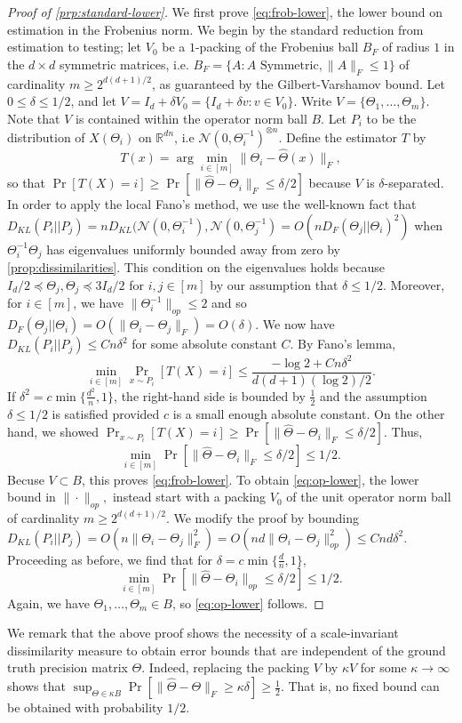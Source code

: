 \documentclass[aos]{imsart}
\theoremstyle{definition}
\numberwithin{equation}{section}
\newcommand{\R}{{\mathbb{R}}}
\newcommand{\htheta}{\widehat{\Theta}}
\newcommand{\ot}{\otimes}
\begin{document}
\begin{proof}[Proof of \cref{prp:standard-lower}]
We first prove \cref{eq:frob-lower}, the lower bound on estimation in the Frobenius norm. We begin by the standard reduction from estimation to testing; let $V_0$ be a $1$-packing of the Frobenius ball $B_F$ of radius $1$ in the $d\times d$ symmetric matrices, i.e. $B_F = \{A: A \text{ Symmetric}, \|A\|_F \leq 1\}$ of cardinality $m \geq 2^{d(d+1)/2}$, as guaranteed by the Gilbert-Varshamov bound. Let $0 \leq \delta \leq 1/2$, and let $V = I_d + \delta V_0 = \{I_d + \delta v: v \in V_0\}$. Write $V = \{\Theta_1, \dots, \Theta_m\}$. Note that $V$ is contained within the operator norm ball $B$.
Let $P_i$ to be the distribution of $X(\Theta_i)$ on $\R^{dn}$, i.e $\mathcal{N}(0, \Theta^{-1}_i)^{\ot n}$. Define the estimator $T$ by 
$$T(x) = \arg\min_{i \in [m]} \|\Theta_i - \htheta(x)\|_F,$$
so that $\Pr[T(X) = i] \geq \Pr[\|\htheta -  \Theta_i\|_F \leq \delta/2]$ because $V$ is $\delta$-separated. In order to apply the local Fano's method, we use the well-known fact that $D_{KL}(P_i|| P_j) = n D_{KL}(\mathcal{N}(0, \Theta_i^{-1}), \mathcal{N}(0, \Theta_j^{-1}) = O(nD_{F}(\Theta_j || \Theta_i)^2)$ when $\Theta_i^{-1}\Theta_j$ has eigenvalues uniformly bounded away from zero by \cref{prop:dissimilarities}. This condition on the eigenvalues holds because $I_d/2 \preceq \Theta_j, \Theta_j \preceq 3I_d/2$ for $i,j \in [m]$ by our assumption that $\delta \leq 1/2$. Moreover, for $i \in [m]$, we have $\|\Theta_i^{-1}\|_{op} \leq 2$ and so $D_F(\Theta_j|| \Theta_i) = O( \|\Theta_i - \Theta_j\|_F) = O(\delta).$ We now have $D_{KL}(P_i|| P_j) \leq Cn \delta^2$ for some absolute constant $C$. By Fano's lemma, 
 $$\min_{i \in [m]} \Pr_{x \sim P_i}[T(X) =  i] \leq \frac{ - \log 2 + C n \delta^2}{d(d+1)(\log 2)/2 }.$$
If $\delta^2 = c\min\{ \frac{d^2}{n}, 1\}$, the right-hand side is bounded by $\frac{1}{2}$ and the assumption $\delta \leq 1/2$ is satisfied provided $c$ is a small enough absolute constant. On the other hand, we showed $\Pr_{x \sim P_i}[T(X) =  i] \geq \Pr[\|\htheta -  \Theta_i\|_F \leq \delta/2]$. Thus, 
$$\min_{i \in [m]} \Pr[ \|\htheta - \Theta_i\|_F \leq \delta/2] \leq 1/2.$$
Becuse $V \subset B$, this proves \cref{eq:frob-lower}. 
To obtain \cref{eq:op-lower}, the lower bound in $\| \cdot \|_{op},$ instead start with a packing $V_0$ of the unit operator norm ball of cardinality $m \geq 2^{d(d+1)/2}$. We modify the proof by bounding $D_{KL}(P_i || P_j) = O(n \| \Theta_i - \Theta_j\|_F^2) = O(n d \|\Theta_i - \Theta_j\|_{op}^2) \leq C nd \delta^2.$ Proceeding as before, we find that for $\delta = c \min \{\frac{d}{n}, 1\}$, 
$$\min_{i \in [m]} \Pr[ \|\htheta - \Theta_i\|_{op} \leq \delta/2] \leq 1/2.$$
Again, we have $\Theta_1, \dots, \Theta_m \in B$, so \cref{eq:op-lower} follows. \end{proof}
We remark that the above proof shows the necessity of a scale-invariant dissimilarity measure to obtain error bounds that are independent of the ground truth precision matrix $\Theta$. Indeed, replacing the packing $V$ by $\kappa V$ for some $\kappa \to \infty$ shows that $\sup_{\Theta \in \kappa B} \Pr\left[ \| \htheta - \Theta\|_F \geq \kappa \delta \right] \geq \frac{1}{2}$. That is, no fixed bound can be obtained with probability $1/2$. 
\end{document}
